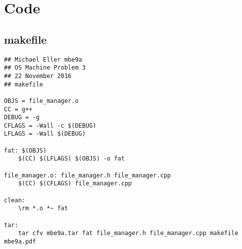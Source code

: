 \documentclass[12pt,letter,titlepage]{article}
\begin{document}
\pagebreak
\section*{Code}
\linespread{1}
\subsection*{makefile}{
\scriptsize{
\begin{verbatim}
## Michael Eller mbe9a
## OS Machine Problem 3
## 22 November 2016
## makefile

OBJS = file_manager.o
CC = g++
DEBUG = -g
CFLAGS = -Wall -c $(DEBUG)
LFLAGS = -Wall $(DEBUG)

fat: $(OBJS)
	$(CC) $(LFLAGS) $(OBJS) -o fat

file_manager.o: file_manager.h file_manager.cpp
	$(CC) $(CFLAGS) file_manager.cpp

clean:
	\rm *.o *~ fat

tar:
	tar cfv mbe9a.tar fat file_manager.h file_manager.cpp makefile mbe9a.pdf
\end{verbatim}
}}
\end{document}
